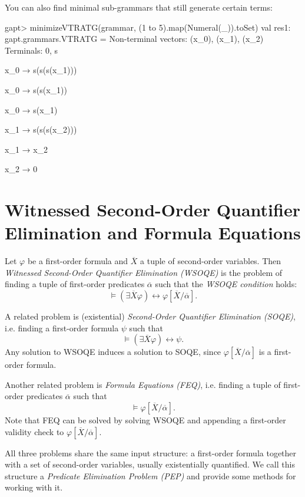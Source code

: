 \documentclass[a4paper,11pt]{book}
\begin{document}
You can also find minimal sub-grammars that still generate certain terms:
\begin{clilisting}
  gapt> minimizeVTRATG(grammar, (1 to 5).map(Numeral(_)).toSet)
  val res1: gapt.grammars.VTRATG =
  Non-terminal vectors: (x_0), (x_1), (x_2)
  Terminals: 0, s

  x_0 → s(s(s(x_1)))

  x_0 → s(s(x_1))

  x_0 → s(x_1)

  x_1 → s(s(s(x_2)))

  x_1 → x_2

  x_2 → 0

\end{clilisting}

\section{Witnessed Second-Order Quantifier Elimination and Formula Equations}

Let $\varphi$ be a first-order formula and $\overline{X}$ a tuple of second-order variables.
Then \emph{Witnessed Second-Order Quantifier Elimination (WSOQE)} is the problem of finding a tuple of first-order predicates $\overline{\alpha}$ such that the \emph{WSOQE condition} holds:
\begin{equation}
  \label{eq:second-order-elimination-with-witness}
  \models (\exists \overline{X} \varphi) \leftrightarrow \varphi[\overline{X} / \overline{\alpha}].
\end{equation}

A related problem is (existential) \emph{Second-Order Quantifier Elimination (SOQE)}, i.e. finding a first-order formula $\psi$ such that
$$\models (\exists \overline{X} \varphi) \leftrightarrow \psi.$$
Any solution to WSOQE induces a solution to SOQE, since $\varphi[\overline{X} / \overline{\alpha}]$ is a first-order formula.

Another related problem is \emph{Formula Equations (FEQ)}, i.e. finding a tuple of first-order predicates $\overline{\alpha}$ such that
$$\models \varphi[\overline{X}/ \overline{\alpha}].$$
Note that FEQ can be solved by solving WSOQE and appending a first-order validity check to $\varphi[\overline{X} / \overline{\alpha}]$.

All three problems share the same input structure: a first-order formula together with a set of second-order variables, usually existentially quantified. We call this structure a \emph{Predicate Elimination Problem (PEP)} and provide some methods for working with it.
\end{document}
